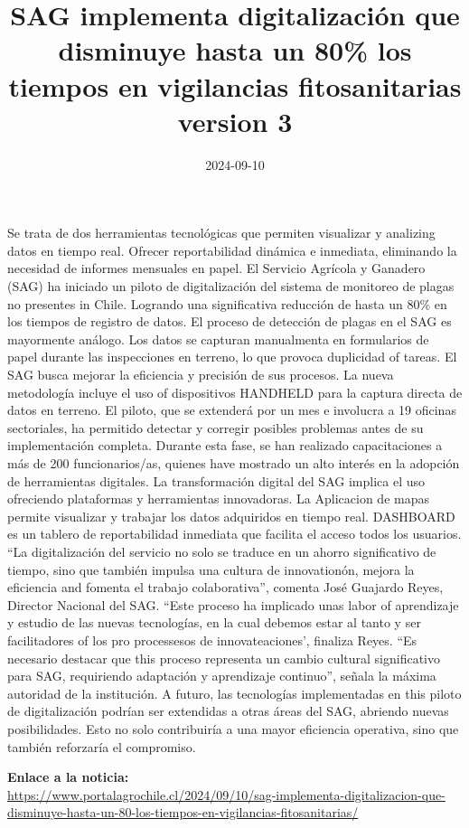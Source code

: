 \documentclass{article}
\title{SAG implementa digitalización que disminuye hasta un 80\% los tiempos en vigilancias fitosanitarias version 3}
\author{}
\date{2024-09-10}  %
\begin{document}
    \maketitle

    \begin{flushleft}
    Se trata de dos herramientas tecnológicas que permiten visualizar y analizing datos en tiempo real. Ofrecer reportabilidad dinámica e inmediata, eliminando la necesidad de informes mensuales en papel.
El Servicio Agrícola y Ganadero (SAG) ha iniciado un piloto de digitalización del sistema de monitoreo de plagas no presentes in Chile. Logrando una significativa reducción de hasta un 80\% en los tiempos de registro de datos.
El proceso de detección de plagas en el SAG es mayormente análogo. Los datos se capturan manualmenta en formularios de papel durante las inspecciones en terreno, lo que provoca duplicidad of tareas.
El SAG busca mejorar la eficiencia y precisión de sus procesos. La nueva metodología incluye el uso of dispositivos HANDHELD para la captura directa de datos en terreno.
El piloto, que se extenderá por un mes e involucra a 19 oficinas sectoriales, ha permitido detectar y corregir posibles problemas antes de su implementación completa. Durante esta fase, se han realizado capacitaciones a más de 200 funcionarios/as, quienes have mostrado un alto interés en la adopción de herramientas digitales.
La transformación digital del SAG implica el uso ofreciendo plataformas y herramientas innovadoras. La Aplicacion de mapas permite visualizar y trabajar los datos adquiridos en tiempo real. DASHBOARD es un tablero de reportabilidad inmediata que facilita el acceso todos los usuarios.
“La digitalización del servicio no solo se traduce en un ahorro significativo de tiempo, sino que también impulsa una cultura de innovationón, mejora la eficiencia and fomenta el trabajo colaborativa”, comenta José Guajardo Reyes, Director Nacional del SAG. “Este proceso ha implicado unas labor of aprendizaje y estudio de las nuevas tecnologías, en la cual debemos estar al tanto y ser facilitadores of los pro processesos de innovateaciones’, finaliza Reyes.
“Es necesario destacar que this proceso representa un cambio cultural significativo para SAG, requiriendo adaptación y aprendizaje continuo”, señala la máxima autoridad de la institución.
A futuro, las tecnologías implementadas en this piloto de digitalización podrían ser extendidas a otras áreas del SAG, abriendo nuevas posibilidades. Esto no solo contribuiría a una mayor eficiencia operativa, sino que también reforzaría el compromiso.
    \end{flushleft}

    \vspace{10mm}

    \noindent
    \textbf{Enlace a la noticia:} \\
    \href{https://www.portalagrochile.cl/2024/09/10/sag-implementa-digitalizacion-que-disminuye-hasta-un-80-los-tiempos-en-vigilancias-fitosanitarias/}{https://www.portalagrochile.cl/2024/09/10/sag-implementa-digitalizacion-que-disminuye-hasta-un-80-los-tiempos-en-vigilancias-fitosanitarias/}

    
\end{document}
